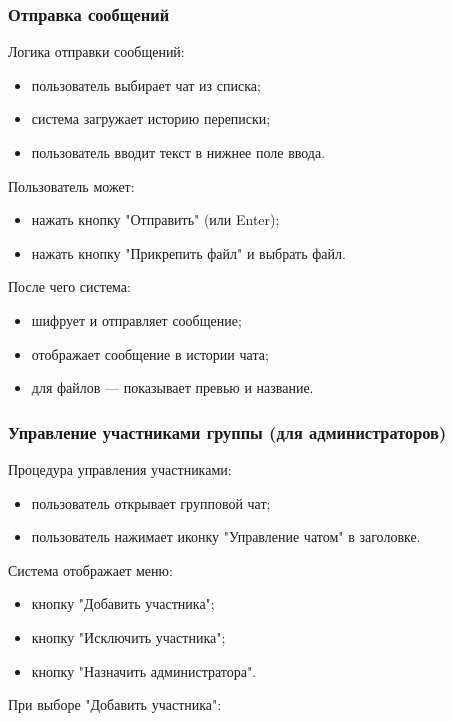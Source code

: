 \subsubsection{Отправка сообщений}  
Логика отправки сообщений:  
\begin{itemize}  
	\item пользователь выбирает чат из списка;  
	\item система загружает историю переписки;  
	\item пользователь вводит текст в нижнее поле ввода.
\end{itemize}

Пользователь может:

\begin{itemize}
		\item нажать кнопку "Отправить" (или Enter);  
		\item нажать кнопку "Прикрепить файл" и выбрать файл.
\end{itemize}

После чего система:

\begin{itemize}
		\item шифрует и отправляет сообщение;  
		\item отображает сообщение в истории чата;  
		\item для файлов — показывает превью и название.   
\end{itemize}  

\subsubsection{Управление участниками группы (для администраторов)}  
Процедура управления участниками:  
\begin{itemize}  
	\item пользователь открывает групповой чат;  
	\item пользователь нажимает иконку "Управление чатом" в заголовке.  
\end{itemize}

Система отображает меню:

\begin{itemize}  
	\item кнопку "Добавить участника";  
	\item кнопку "Исключить участника";  
	\item кнопку "Назначить администратора".  
\end{itemize}

При выборе "Добавить участника":  


